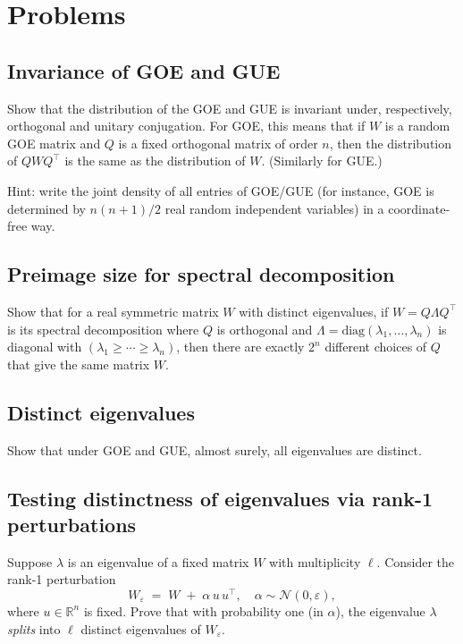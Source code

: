 \documentclass[letterpaper,11pt,oneside,reqno]{book}
\numberwithin{equation}{chapter}  %
\theoremstyle{definition}
\begin{document}
\section{Problems}

\subsection{Invariance of GOE and GUE}
\label{lecture3:prob:invariance_GOE_GUE}

Show that the distribution of the GOE and GUE is
invariant under, respectively, orthogonal and unitary conjugation.
For GOE, this means that if \(W\)
is a random GOE matrix and \(Q\) is a fixed orthogonal
matrix of order $n$, then the distribution
of \(QWQ^\top\) is the same as the distribution of \(W\).
(Similarly for GUE.)

\medskip
\noindent
Hint: write the joint density of all entries of GOE/GUE (for instance, GOE
is determined by $n(n+1)/2$ real random independent variables)
in a coordinate-free way.


\subsection{Preimage size for spectral decomposition}
\label{lecture3:prob:GOE-preimage}

Show that for a real symmetric matrix $W$ with distinct eigenvalues,
if $W=Q\Lambda Q^\top$ is its spectral decomposition
where $Q$ is orthogonal and $\Lambda=\mathrm{diag}(\lambda_1,\ldots,\lambda_n)$
is diagonal with $(\lambda_1\ge \cdots\ge \lambda_n)$,
then there are exactly $2^n$ different choices of $Q$
that give the same matrix $W$.

\subsection{Distinct eigenvalues}
\label{lecture3:prob:distinct-eigenvalues}

Show that under GOE and GUE, almost surely,
all eigenvalues are distinct.


\subsection{Testing distinctness of eigenvalues via rank-1 perturbations}
\label{lecture3:prob:distinct-eigs-rank1}
  Suppose \(\lambda\) is an eigenvalue of a fixed matrix
	\(W\) with multiplicity \(\ell\). Consider the rank-1 perturbation
  \[
     W_{\varepsilon} \;=\; W \;+\;\alpha \, u \, u^\top,
     \quad \alpha \sim \mathcal{N}(0,\varepsilon),
  \]
  where \(u \in \mathbb{R}^n\) is fixed. Prove that with probability one (in \(\alpha\)), the eigenvalue \(\lambda\) \emph{splits} into \(\ell\) distinct eigenvalues of \(W_{\varepsilon}\).
\end{document}
